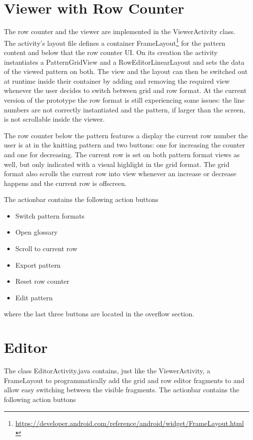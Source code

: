 \section{Viewer with Row Counter}
The row counter and the viewer are implemented in the ViewerActivity class. The activity's layout file defines a container FrameLayout\footnote{\url{https://developer.android.com/reference/android/widget/FrameLayout.html}} for the pattern content and below that the row counter \gls{UI}. On its creation the activity instantiates a PatternGridView and a RowEditorLinearLayout and sets the data of the viewed pattern on both. The view and the layout can then be switched out at runtime inside their container by adding and removing the required view whenever the user decides to switch between grid and row format.
At the current version of the prototype the row format is still experiencing some issues: the line numbers are not correctly instantiated and the pattern, if larger than the screen, is not scrollable inside the viewer.

The row counter below the pattern features a display the current row number the user is at in the knitting pattern and two buttons: one for increasing the counter and one for decreasing. The current row is set on both pattern format views as well, but only indicated with a visual highlight in the grid format. The grid format also scrolls the current row into view whenever an increase or decrease happens and the current row is offscreen. 

The actionbar contains the following action buttons

\begin{itemize}
\item Switch pattern formats
\item Open glossary
\item Scroll to current row
\item Export pattern
\item Reset row counter
\item Edit pattern
\end{itemize}

where the last three buttons are located in the overflow section.

\section{Editor}
The class EditorActivity.java contains, just like the ViewerActivity, a FrameLayout to programmatically add the grid and row editor fragments to and allow easy switching between the visible fragments. The actionbar contains the following action buttons 

